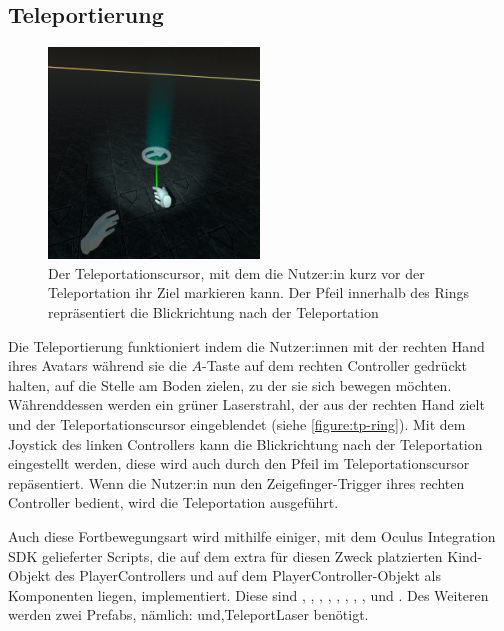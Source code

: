 \subsection{Teleportierung}\label{subsec:teleport-implementation}
\begin{figure}[!h]
    \centering
    \includegraphics[width=0.5\textwidth]{vrscreenshots/teleportring.jpg}
    \caption{Der Teleportationscursor, mit dem die Nutzer:in kurz vor der Teleportation ihr Ziel markieren kann. Der Pfeil innerhalb des Rings repräsentiert die Blickrichtung nach der Teleportation}\label{figure:tp-ring}
\end{figure}
    Die Teleportierung funktioniert indem die Nutzer:innen mit der rechten Hand ihres Avatars während sie die $A$-Taste auf dem rechten Controller gedrückt halten, auf die Stelle am Boden zielen, zu der sie sich bewegen möchten. Währenddessen werden ein grüner Laserstrahl, der aus der rechten Hand zielt und der Teleportationscursor eingeblendet (siehe \autoref{figure:tp-ring}). Mit dem Joystick des linken Controllers kann die Blickrichtung nach der Teleportation eingestellt werden, diese wird auch durch den Pfeil im Teleportationscursor repäsentiert. Wenn die Nutzer:in nun den Zeigefinger-Trigger ihres rechten Controller bedient, wird die Teleportation ausgeführt.

    Auch diese Fortbewegungsart wird mithilfe einiger, mit dem Oculus Integration SDK gelieferter Scripts, die auf dem extra für diesen Zweck platzierten Kind-Objekt des PlayerControllers  und auf dem PlayerController-Objekt als Komponenten liegen, implementiert. Diese sind , , , , , , , , und . Des Weiteren werden zwei Prefabs, nämlich:  und\textquote,{TeleportLaser} benötigt.

